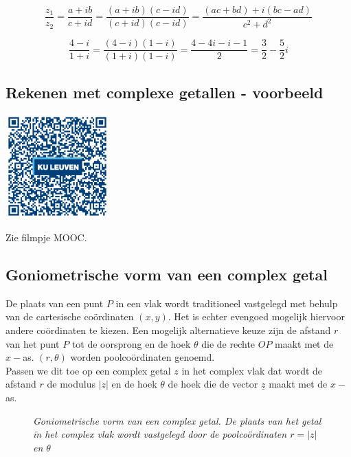 \begin{framed}
\[ \frac{z_{1}}{z_{2}}=\frac{a+ib}{c+id}=\frac{(a+ib)(c-id)}{(c+id)(c-id)}=\frac{(ac+bd)+i(bc-ad)}{c^2 +d^2}  \]
\end{framed}

\begin{voorbeeld}	
\[ \frac{4-i}{1+i}=\frac{(4-i)(1-i)}{(1+i)(1-i)}=\frac{4-4i-i-1}{2}=\frac{3}{2}-\frac{5}{2}i \]
\end{voorbeeld}

\subsection{Rekenen met complexe getallen - voorbeeld}
\begin{minipage}{.25\linewidth}
	\raggedright
	\includegraphics[width=4cm]{3_gonio_complexe_getallen/inputs/QR_Code_REKENENCOMPLVB_module3new}
\end{minipage}
\begin{minipage}{.7\linewidth}
	Zie filmpje MOOC.
\end{minipage}

\subsection{Goniometrische vorm van een complex getal}

De plaats van een punt $P$ in een vlak wordt traditioneel vastgelegd met behulp van de cartesische co\"{o}rdinaten $(x,y)$. Het is echter evengoed mogelijk hiervoor andere co\"{o}rdinaten te kiezen. Een mogelijk alternatieve keuze zijn de afstand $r$ van het punt $P$ tot de oorsprong en de hoek $\theta$ die de rechte $OP$ maakt met de $x-$as. $(r,\theta)$ worden poolco\"{o}rdinaten genoemd.\\
Passen we dit toe op een complex getal $z$ in het complex vlak dat wordt de afstand $r$ de modulus $|z|$ en de hoek $\theta$ de hoek die de vector $\underline{z}$ maakt met de $x-$as.\\

\begin{figure}[H]
	\centering 
	 
		\caption{\it Goniometrische vorm van een complex getal. De plaats van het getal in het complex vlak wordt vastgelegd door de poolco\"{o}rdinaten $r=|z|$ en $\theta$}
\end{figure}


